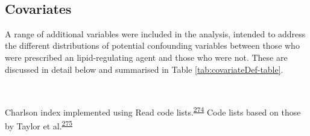 \documentclass[a4paper, twoside]{templates/ociamthesis}
\begin{document}
~

\hypertarget{covariates}{%
\subsection{Covariates}\label{covariates}}

A range of additional variables were included in the analysis, intended to address the different distributions of potential confounding variables between those who were prescribed an lipid-regulating agent and those who were not. These are discussed in detail below and summarised in Table \ref{tab:covariateDef-table}.

~









Charlson index implemented using Read code lists.\textsuperscript{\protect\hyperlink{ref-khan2010}{274}} Code lists based on those by Taylor et al.\textsuperscript{\protect\hyperlink{ref-taylor2016}{275}}
\end{document}
